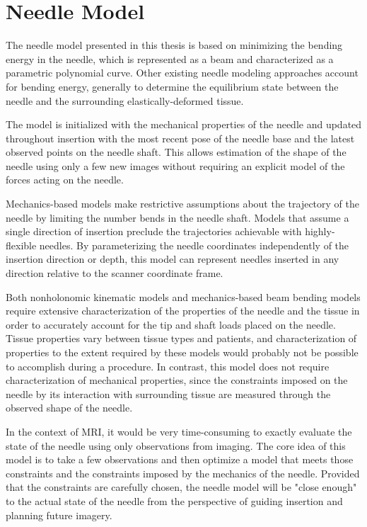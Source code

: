 \chapter{Needle Model}
\label{sec:needlemodel} %

The needle model presented in this thesis is based on minimizing the bending energy in the needle, which is represented as a beam and characterized as a parametric polynomial curve. Other existing needle modeling approaches account for bending energy, generally to determine the equilibrium state between the needle and the surrounding elastically-deformed tissue\cite{roesthuis_modeling_2015, misra_mechanics_2010, abayazid_integrating_2013}.

The model is initialized with the mechanical properties of the needle and updated throughout insertion with the most recent pose of the needle base and the latest observed points on the needle shaft. This allows estimation of the shape of the needle using only a few new images without requiring an explicit model of the forces acting on the needle.

Mechanics-based models make restrictive assumptions about the trajectory of the needle by limiting the number bends in the needle shaft\cite{abayazid_integrating_2013}. Models that assume a single direction of insertion preclude the trajectories achievable with highly-flexible needles. By parameterizing the needle coordinates independently of the insertion direction or depth, this model can represent needles inserted in any direction relative to the scanner coordinate frame.

Both nonholonomic kinematic models and mechanics-based beam bending models require extensive characterization of the properties of the needle and the tissue in order to accurately account for the tip and shaft loads placed on the needle. Tissue properties vary between tissue types and patients, and characterization of properties to the extent required by these models would probably not be possible to accomplish during a procedure. In contrast, this model does not require characterization of mechanical properties, since the constraints imposed on the needle by its interaction with surrounding tissue are measured through the observed shape of the needle.

In the context of MRI, it would be very time-consuming to exactly evaluate the state of the needle using only observations from imaging. The core idea of this model is to take a few observations and then optimize a model that meets those constraints and the constraints imposed by the mechanics of the needle. Provided that the constraints are carefully chosen, the needle model will be "close enough" to the actual state of the needle from the perspective of guiding insertion and planning future imagery.

